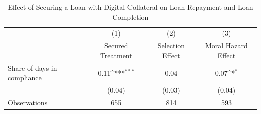 \begin{table}[htbp]\centering
\def\sym#1{\ifmmode^{#1}\else\(^{#1}\)\fi}
\caption{Effect of Securing a Loan with Digital Collateral on Loan Repayment and Loan Completion\label{LASMH\_repay\_LATE\_200}}
\begin{tabular}{l*{3}{c}}
\toprule
                    &\multicolumn{1}{c}{(1)}&\multicolumn{1}{c}{(2)}&\multicolumn{1}{c}{(3)}\\
                    &\multicolumn{1}{c}{Secured Treatment}&\multicolumn{1}{c}{Selection Effect}&\multicolumn{1}{c}{Moral Hazard Effect}\\
\midrule
Share of days in compliance&        0.11\sym{***}&        0.04         &        0.07\sym{*}  \\
                    &      (0.04)         &      (0.03)         &      (0.04)         \\
\midrule
Observations        &         655         &         814         &         593         \\
\bottomrule
\end{tabular}
\end{table}
